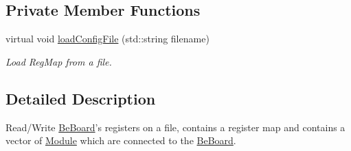 \subsection*{Private Member Functions}
\begin{DoxyCompactItemize}
\item 
virtual void \hyperlink{class_ph2___hw_description_1_1_be_board_a1aaade58f564544b17de9509ad82cb0e}{load\-Config\-File} (std\-::string filename)
\begin{DoxyCompactList}\small\item\em Load Reg\-Map from a file. \end{DoxyCompactList}\end{DoxyCompactItemize}


\subsection{Detailed Description}
Read/\-Write \hyperlink{class_ph2___hw_description_1_1_be_board}{Be\-Board}'s registers on a file, contains a register map and contains a vector of \hyperlink{class_ph2___hw_description_1_1_module}{Module} which are connected to the \hyperlink{class_ph2___hw_description_1_1_be_board}{Be\-Board}. 

